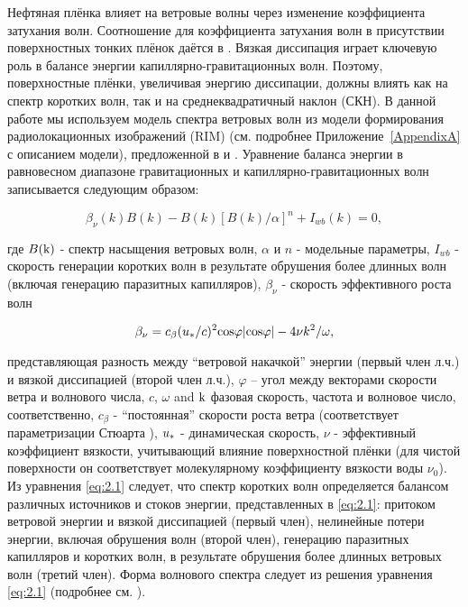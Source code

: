 Нефтяная плёнка влияет на ветровые волны через изменение коэффициента затухания волн. Соотношение для коэффициента затухания волн в присутствии поверхностных тонких плёнок даётся в \citep{Levich1962}. Вязкая диссипация играет ключевую роль в балансе энергии капиллярно-гравитационных волн. Поэтому, поверхностные плёнки, увеличивая энергию диссипации, должны влиять как на спектр коротких волн, так и на среднеквадратичный наклон (СКН). В данной работе мы используем модель спектра ветровых волн из модели формирования радиолокационных изображений (RIM) (см. подробнее Приложение~\ref{AppendixA} с описанием модели), предложенной в \citep{Kudryavtsev2005} и \citep{Johannessen2005}. Уравнение баланса энергии в равновесном диапазоне гравитационных и капиллярно-гравитационных волн записывается следующим образом:


\begin{equation} \label{eq:2.1}
\beta_{\nu }(k) B(k) - B(k) \left[ B(k) / \alpha \right]^n + I_{wb}(k) = 0 ,
\end{equation}


\noindent где $B({\rm k})$ - спектр насыщения ветровых волн, $\alpha $ и $n$ - модельные параметры, $I_{wb}^{} $ - скорость генерации коротких волн в результате обрушения более длинных волн (включая генерацию паразитных капилляров), $\beta_{\nu } $ - скорость эффективного роста волн



\begin{equation} \label{eq:2.2} 
\beta _{\nu } =c_{\beta } (u_{{\rm *}} /c)^{2} {\rm cos}\varphi |{\rm cos}\varphi |-4\nu k^{2} /\omega ,
\end{equation}


\noindent представляющая разность между ``ветровой накачкой'' энергии (первый член л.ч.) и вязкой диссипацией (второй член л.ч.), $\varphi $ -- угол между векторами скорости ветра и волнового числа, $c$, $\omega $ and ${\rm k}$ фазовая скорость, частота и волновое число, соответственно, $c_{\beta } $ - ``постоянная'' скорости роста ветра (соответствует параметризации Стюарта \citep{Stewart1974}), $u_{{\rm *}} $ - динамическая скорость, $\nu $ - эффективный коэффициент вязкости, учитывающий влияние поверхностной плёнки (для чистой поверхности он соответствует молекулярному коэффициенту вязкости воды $\nu _{0} $). Из уравнения \eqref{eq:2.1} следует, что спектр коротких волн определяется балансом различных источников и стоков энергии, представленных в \eqref{eq:2.1}: притоком ветровой энергии и вязкой диссипацией (первый член), нелинейные потери энергии, включая обрушения волн (второй член), генерацию паразитных капилляров и коротких волн, в результате обрушения более длинных ветровых волн (третий член). Форма волнового спектра следует из решения уравнения \eqref{eq:2.1} (подробнее см. \citep{Kudryavtsev2005}).

